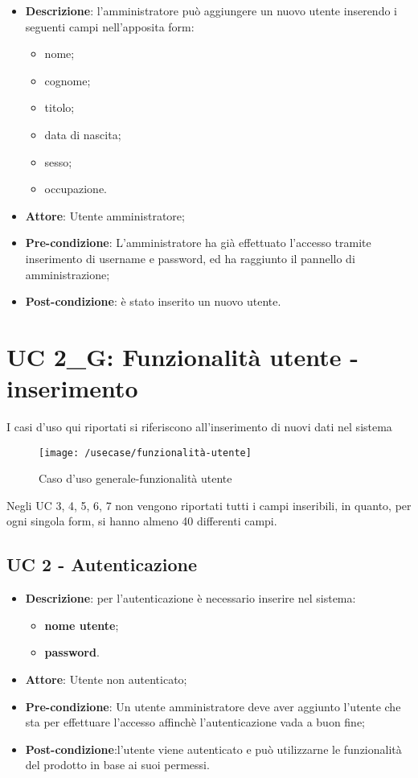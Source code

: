 \begin{itemize}
	\item \textbf{Descrizione}: l'amministratore può aggiungere un nuovo utente inserendo i seguenti campi nell'apposita form:
	\begin{itemize}
		\item nome;
		\item cognome;
		\item titolo;
		\item data di nascita;
		\item sesso;
		\item occupazione.
	\end{itemize}
	\item \textbf{Attore}: Utente amministratore;
	\item \textbf{Pre-condizione}: L'amministratore ha già effettuato l'accesso tramite inserimento di username e password, ed ha raggiunto il pannello di amministrazione;
	\item \textbf{Post-condizione}: è stato inserito un nuovo utente.
\end{itemize}

\newpage

\section{UC 2\_G: Funzionalità utente - inserimento}

I casi d'uso qui riportati si riferiscono all'inserimento di nuovi dati nel sistema

\begin{figure}[h]
	\centering
	\texttt{[image: /usecase/funzionalità-utente]}
	\caption{Caso d'uso generale-funzionalità utente}
\end{figure}

Negli UC 3, 4, 5, 6, 7 non vengono riportati tutti i campi inseribili, in quanto, per ogni singola form, si hanno almeno 40 differenti campi.\\

\subsection{UC 2 - Autenticazione}

\begin{itemize}
	\item \textbf{Descrizione}: per l'autenticazione è necessario inserire nel sistema:
	\begin{itemize}
		\item \textbf{nome utente};
		\item \textbf{password}.
	\end{itemize}
	\item \textbf{Attore}: Utente non autenticato;
	\item \textbf{Pre-condizione}: Un utente amministratore deve aver aggiunto l'utente che sta per effettuare l'accesso affinchè l'autenticazione vada a buon fine;
	\item \textbf{Post-condizione}:l'utente viene autenticato e può utilizzarne le funzionalità del prodotto in base ai suoi permessi.
\end{itemize}

